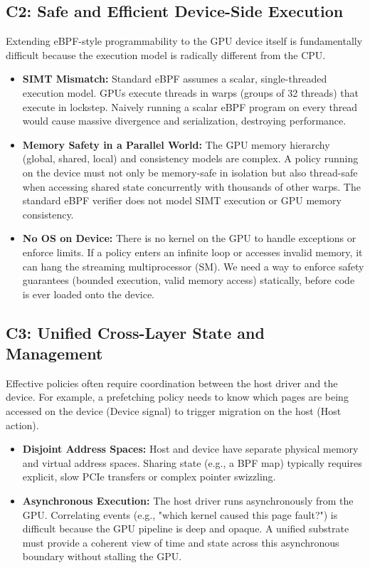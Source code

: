 \subsection{C2: Safe and Efficient Device-Side Execution}
Extending eBPF-style programmability to the GPU device itself is fundamentally difficult because the execution model is radically different from the CPU.
\begin{itemize}[leftmargin=*]
    \item \textbf{SIMT Mismatch:} Standard eBPF assumes a scalar, single-threaded execution model. GPUs execute threads in warps (groups of 32 threads) that execute in lockstep. Naively running a scalar eBPF program on every thread would cause massive divergence and serialization, destroying performance.
    \item \textbf{Memory Safety in a Parallel World:} The GPU memory hierarchy (global, shared, local) and consistency models are complex. A policy running on the device must not only be memory-safe in isolation but also thread-safe when accessing shared state concurrently with thousands of other warps. The standard eBPF verifier does not model SIMT execution or GPU memory consistency.
    \item \textbf{No OS on Device:} There is no kernel on the GPU to handle exceptions or enforce limits. If a policy enters an infinite loop or accesses invalid memory, it can hang the streaming multiprocessor (SM). We need a way to enforce safety guarantees (bounded execution, valid memory access) statically, before code is ever loaded onto the device.
\end{itemize}

\subsection{C3: Unified Cross-Layer State and Management}
Effective policies often require coordination between the host driver and the device. For example, a prefetching policy needs to know which pages are being accessed on the device (Device signal) to trigger migration on the host (Host action).
\begin{itemize}[leftmargin=*]
    \item \textbf{Disjoint Address Spaces:} Host and device have separate physical memory and virtual address spaces. Sharing state (e.g., a BPF map) typically requires explicit, slow PCIe transfers or complex pointer swizzling.
    \item \textbf{Asynchronous Execution:} The host driver runs asynchronously from the GPU. Correlating events (e.g., "which kernel caused this page fault?") is difficult because the GPU pipeline is deep and opaque. A unified substrate must provide a coherent view of time and state across this asynchronous boundary without stalling the GPU.
\end{itemize}
